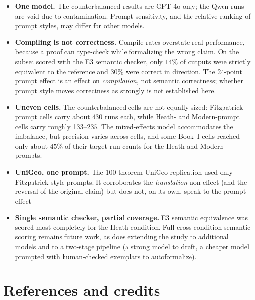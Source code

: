 \documentclass[11pt]{article}
\begin{document}
\begin{itemize}
\setlength{\itemsep}{0.25em}

\item \textbf{One model.} The counterbalanced results are GPT-4o only; the Qwen
runs are void due to contamination. Prompt sensitivity, and the relative ranking
of prompt styles, may differ for other models.

\item \textbf{Compiling is not correctness.} Compile rates overstate real
performance, because a proof can type-check while formalizing the wrong claim.
On the subset scored with the E3 semantic checker, only $14\%$ of outputs were
strictly equivalent to the reference and $30\%$ were correct in direction. The
24-point prompt effect is an effect on \emph{compilation}, not semantic
correctness; whether prompt style moves correctness as strongly is not
established here.

\item \textbf{Uneven cells.} The counterbalanced cells are not equally sized:
Fitzpatrick-prompt cells carry about 430 runs each, while Heath- and
Modern-prompt cells carry roughly 133--235. The mixed-effects model accommodates
the imbalance, but precision varies across cells, and some Book~I cells reached
only about $45\%$ of their target run counts for the Heath and Modern prompts.

\item \textbf{UniGeo, one prompt.} The 100-theorem UniGeo replication used only
Fitzpatrick-style prompts. It corroborates the \emph{translation} non-effect (and
the reversal of the original claim) but does not, on its own, speak to the prompt
effect.

\item \textbf{Single semantic checker, partial coverage.} E3 semantic
equivalence was scored most completely for the Heath condition. Full
cross-condition semantic scoring remains future work, as does extending the study
to additional models and to a two-stage pipeline (a strong model to draft, a
cheaper model prompted with human-checked exemplars to autoformalize).

\end{itemize}

\section*{References and credits}
\end{document}
